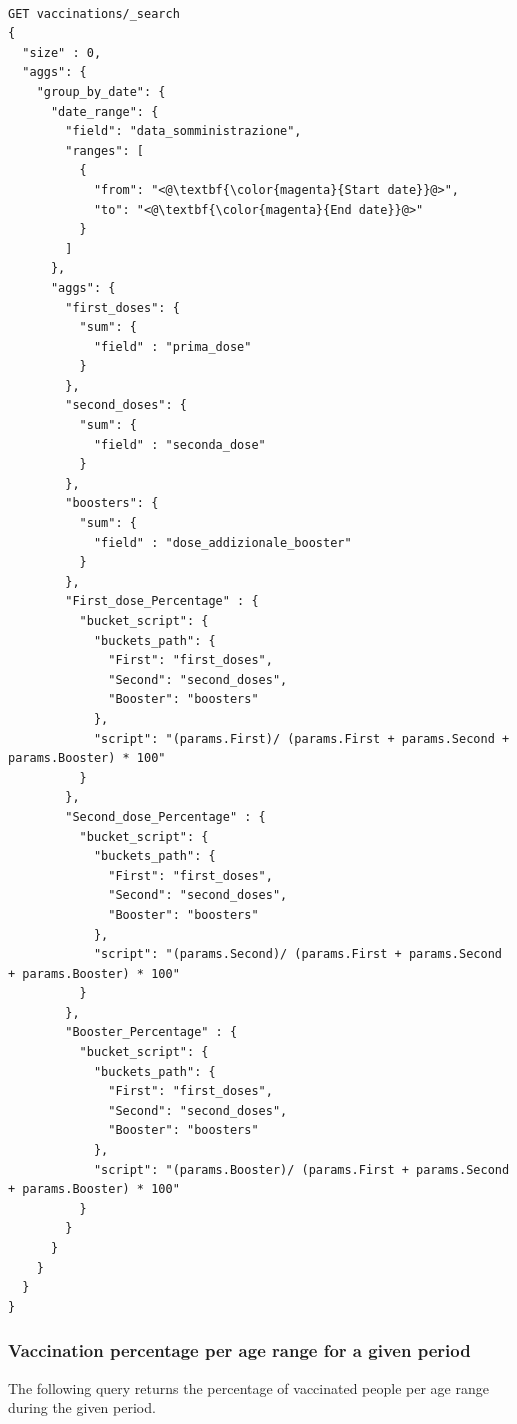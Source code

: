 \documentclass{article}
\begin{document}
\begin{lstlisting}[language=cypher, label=lst:cypher-example]

GET vaccinations/_search
{
  "size" : 0,
  "aggs": {
    "group_by_date": {
      "date_range": {
        "field": "data_somministrazione",
        "ranges": [
          {
            "from": "<@\textbf{\color{magenta}{Start date}}@>",
            "to": "<@\textbf{\color{magenta}{End date}}@>"
          }
        ]
      },
      "aggs": {
        "first_doses": {
          "sum": {
            "field" : "prima_dose"
          }
        },
        "second_doses": {
          "sum": {
            "field" : "seconda_dose"
          }
        },
        "boosters": {
          "sum": {
            "field" : "dose_addizionale_booster"
          }
        },
        "First_dose_Percentage" : {
          "bucket_script": {
            "buckets_path": {
              "First": "first_doses",
              "Second": "second_doses",
              "Booster": "boosters"
            },
            "script": "(params.First)/ (params.First + params.Second + params.Booster) * 100"
          }
        },
        "Second_dose_Percentage" : {
          "bucket_script": {
            "buckets_path": {
              "First": "first_doses",
              "Second": "second_doses",
              "Booster": "boosters"
            },
            "script": "(params.Second)/ (params.First + params.Second + params.Booster) * 100"
          }
        },
        "Booster_Percentage" : {
          "bucket_script": {
            "buckets_path": {
              "First": "first_doses",
              "Second": "second_doses",
              "Booster": "boosters"
            },
            "script": "(params.Booster)/ (params.First + params.Second + params.Booster) * 100"
          }
        }
      }
    }
  }
}

\end{lstlisting}
\subsubsection{Vaccination percentage per age range for a given period}
The following query returns the percentage of vaccinated people per age range during the given period.
\end{document}
